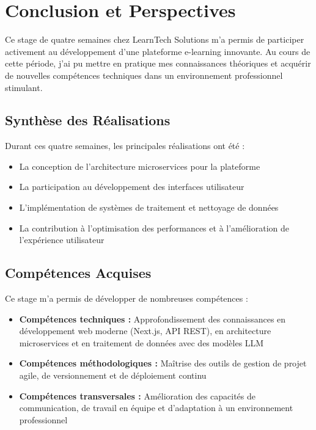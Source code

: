 \documentclass[12pt, a4paper]{report}
\begin{document}









\chapter{Conclusion et Perspectives}
\thispagestyle{fancy}

Ce stage de quatre semaines chez LearnTech Solutions m'a permis de participer activement au développement d'une plateforme e-learning innovante. Au cours de cette période, j'ai pu mettre en pratique mes connaissances théoriques et acquérir de nouvelles compétences techniques dans un environnement professionnel stimulant.

\section{Synthèse des Réalisations}

Durant ces quatre semaines, les principales réalisations ont été :
\begin{itemize}
  \item La conception de l'architecture microservices pour la plateforme
  \item La participation au développement des interfaces utilisateur
  \item L'implémentation de systèmes de traitement et nettoyage de données
  \item La contribution à l'optimisation des performances et à l'amélioration de l'expérience utilisateur
\end{itemize}

\section{Compétences Acquises}

Ce stage m'a permis de développer de nombreuses compétences :
\begin{itemize}
  \item \textbf{Compétences techniques :} Approfondissement des connaissances en développement web moderne (Next.js, API REST), en architecture microservices et en traitement de données avec des modèles LLM
  \item \textbf{Compétences méthodologiques :} Maîtrise des outils de gestion de projet agile, de versionnement et de déploiement continu
  \item \textbf{Compétences transversales :} Amélioration des capacités de communication, de travail en équipe et d'adaptation à un environnement professionnel
\end{itemize}
\end{document}
